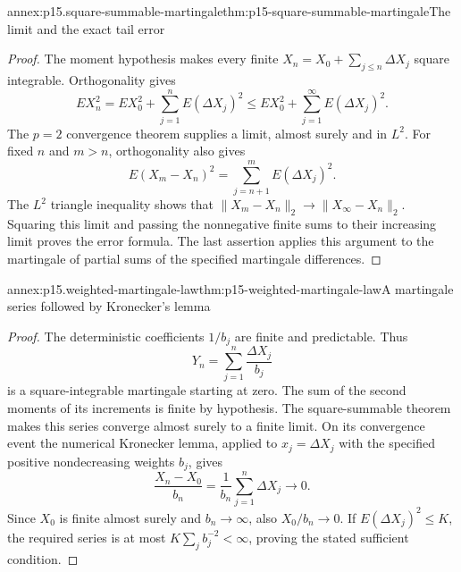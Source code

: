 \begin{annexitem}{annex:p15.square-summable-martingale}{thm:p15-square-summable-martingale}{The limit and the exact tail error}
\begin{proof}
The moment hypothesis makes every finite
\(X_n=X_0+\sum_{j\leq n}\Delta X_j\) square integrable.
Orthogonality gives
\[
              EX_n^2=EX_0^2+\sum_{j=1}^nE(\Delta X_j)^2
                       \leq EX_0^2+\sum_{j=1}^\infty E(\Delta X_j)^2.
\]
The \(p=2\) convergence theorem supplies a limit, almost surely
and in \(L^2\).
For fixed \(n\) and \(m>n\), orthogonality also gives
\[
                         E(X_m-X_n)^2
                                   =\sum_{j=n+1}^mE(\Delta X_j)^2.
\]
The \(L^2\) triangle inequality shows that
\(\|X_m-X_n\|_2\to\|X_\infty-X_n\|_2\).
Squaring this limit and passing the nonnegative finite sums
to their increasing limit proves the error formula.
The last assertion applies this argument to the martingale
of partial sums of the specified martingale differences.
\end{proof}
\end{annexitem}

\begin{annexitem}{annex:p15.weighted-martingale-law}{thm:p15-weighted-martingale-law}{A martingale series followed by Kronecker's lemma}
\begin{proof}
The deterministic coefficients \(1/b_j\) are finite and predictable.
Thus
\[
                         Y_n=\sum_{j=1}^n\frac{\Delta X_j}{b_j}
\]
is a square-integrable martingale starting at zero.
The sum of the second moments of its increments is finite by
hypothesis. The square-summable theorem makes this series converge
almost surely to a finite limit.
On its convergence event the numerical Kronecker lemma, applied
to \(x_j=\Delta X_j\) with the specified positive nondecreasing
weights \(b_j\), gives
\[
                  \frac{X_n-X_0}{b_n}
                         =\frac1{b_n}\sum_{j=1}^n\Delta X_j\longrightarrow0.
\]
Since \(X_0\) is finite almost surely and \(b_n\to\infty\),
also \(X_0/b_n\to0\).
If \(E(\Delta X_j)^2\leq K\), the required series is at most
\(K\sum_jb_j^{-2}<\infty\), proving the stated sufficient condition.
\end{proof}
\end{annexitem}

